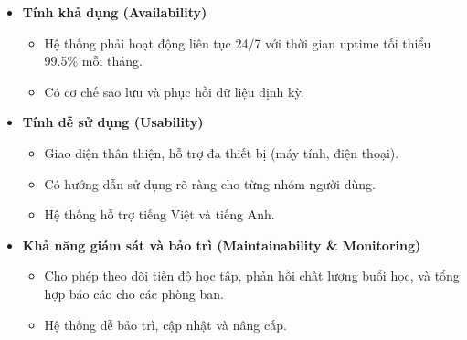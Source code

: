 \begin{itemize}
    \item \textbf{Tính khả dụng (Availability)}
    \begin{itemize}
        \item Hệ thống phải hoạt động liên tục 24/7 với thời gian uptime tối thiểu 99.5\% mỗi tháng.
        \item Có cơ chế sao lưu và phục hồi dữ liệu định kỳ.
    \end{itemize}

    \item \textbf{Tính dễ sử dụng (Usability)}
    \begin{itemize}
        \item Giao diện thân thiện, hỗ trợ đa thiết bị (máy tính, điện thoại).
        \item Có hướng dẫn sử dụng rõ ràng cho từng nhóm người dùng.
        \item Hệ thống hỗ trợ tiếng Việt và tiếng Anh.
    \end{itemize}

    \item \textbf{Khả năng giám sát và bảo trì (Maintainability \& Monitoring)}
    \begin{itemize}
        \item Cho phép theo dõi tiến độ học tập, phản hồi chất lượng buổi học, và tổng hợp báo cáo cho các phòng ban.
        \item Hệ thống dễ bảo trì, cập nhật và nâng cấp.
    \end{itemize}
\end{itemize}